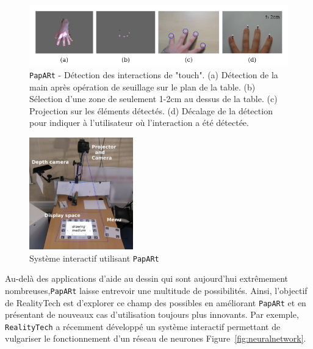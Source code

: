 \begin{figure}
\centering
\includegraphics[width=\linewidth]{images/paparttouch}
\caption{\texttt{PapARt} - Détection des interactions de "touch". (a) Détection de la main après opération de seuillage sur le plan de la table. (b) Sélection d'une zone de seulement 1-2cm au dessus de la table. (c) Projection sur les éléments détectés. (d) Décalage de la détection pour indiquer à l'utilisateur où l'interaction a été détectée.\protect\footnotemark}
\label{fig:papart:touch}
\end{figure}


\begin{figure}[H]
\centering
\includegraphics[width=0.4\textwidth]{images/papart-system}
\caption{Système interactif utilisant \texttt{PapARt}\protect\footnotemark}
\label{fig:papartsystem}
\end{figure}


Au-delà des applications d'aide au dessin qui sont aujourd'hui extrêmement nombreuses,\texttt{PapARt} laisse entrevoir une multitude de possibilités. Ainsi, l'objectif de RealityTech est d'explorer ce champ des possibles en améliorant \texttt{PapARt} et en présentant de nouveaux cas d'utilisation toujours plus innovants. Par exemple, \texttt{RealityTech} a récemment développé un système interactif permettant de vulgariser le fonctionnement d'un réseau de neurones Figure~\ref{fig:neuralnetwork}.

